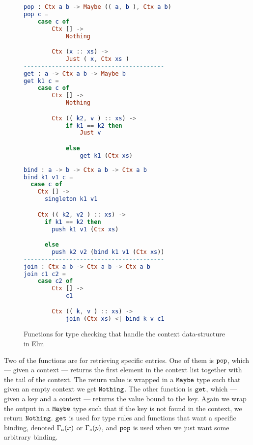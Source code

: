 \begin{figure*}
  \center
  \noindent\begin{minipage}{.45\textwidth}
    \begin{lstlisting}[language=elm,%
                   gobble=0,%
                   ]
pop : Ctx a b -> Maybe (( a, b ), Ctx a b)
pop c =
    case c of
        Ctx [] ->
            Nothing

        Ctx (x :: xs) ->
            Just ( x, Ctx xs )
----------------------------------------
get : a -> Ctx a b -> Maybe b
get k1 c =
    case c of
        Ctx [] ->
            Nothing

        Ctx (( k2, v ) :: xs) ->
            if k1 == k2 then
                Just v

            else
                get k1 (Ctx xs)
\end{lstlisting}
  \end{minipage}\hfill
  \begin{minipage}{.45\textwidth}
    \begin{lstlisting}[language=elm,%
                   gobble=0,%
                   ]
bind : a -> b -> Ctx a b -> Ctx a b
bind k1 v1 c =
  case c of
    Ctx [] ->
      singleton k1 v1

    Ctx (( k2, v2 ) :: xs) ->
      if k1 == k2 then
        push k1 v1 (Ctx xs)

      else
        push k2 v2 (bind k1 v1 (Ctx xs))
----------------------------------------
join : Ctx a b -> Ctx a b -> Ctx a b
join c1 c2 =
    case c2 of
        Ctx [] ->
            c1

        Ctx (( k, v ) :: xs) ->
            join (Ctx xs) <| bind k v c1
\end{lstlisting}
  \end{minipage}\hfill
  \caption{Functions for type checking that handle the context data-structure in Elm}
  \label{fig:ctx-functions}
\end{figure*}

Two of the functions are for retrieving specific entries. One of them is
$\texttt{pop}$, which --- given a context --- returns the first element in the
context list together with the tail of the context. The return value is wrapped
in a $\texttt{Maybe}$ type such that given an empty context we get $\texttt{Nothing}$.
The other function is $\texttt{get}$, which --- given a key and a context ---
returns the value bound to the key. Again we wrap the output in a $\texttt{Maybe}$
type such that if the key is not found in the context, we return
$\texttt{Nothing}$. $\texttt{get}$ is used for type rules and functions that want a
specific binding, denoted $\Gamma_{a}(x)$ or $\Gamma_{e}(p)$, and $\texttt{pop}$ is used
when we just want some arbitrary binding.

